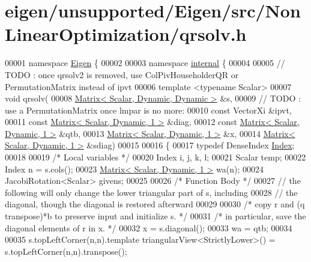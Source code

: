 \hypertarget{eigen_2unsupported_2_eigen_2src_2_non_linear_optimization_2qrsolv_8h_source}{}\section{eigen/unsupported/\+Eigen/src/\+Non\+Linear\+Optimization/qrsolv.h}
\label{eigen_2unsupported_2_eigen_2src_2_non_linear_optimization_2qrsolv_8h_source}

\begin{DoxyCode}
00001 \textcolor{keyword}{namespace }\hyperlink{namespace_eigen}{Eigen} \{ 
00002 
00003 \textcolor{keyword}{namespace }\hyperlink{namespaceinternal}{internal} \{
00004 
00005 \textcolor{comment}{// TODO : once qrsolv2 is removed, use ColPivHouseholderQR or PermutationMatrix instead of ipvt}
00006 \textcolor{keyword}{template} <\textcolor{keyword}{typename} Scalar>
00007 \textcolor{keywordtype}{void} qrsolv(
00008         \hyperlink{group___core___module}{Matrix< Scalar, Dynamic, Dynamic >} &s,
00009         \textcolor{comment}{// TODO : use a PermutationMatrix once lmpar is no more:}
00010         \textcolor{keyword}{const} VectorXi &ipvt,
00011         \textcolor{keyword}{const} \hyperlink{group___core___module}{Matrix< Scalar, Dynamic, 1 >}  &diag,
00012         \textcolor{keyword}{const} \hyperlink{group___core___module}{Matrix< Scalar, Dynamic, 1 >}  &qtb,
00013         \hyperlink{group___core___module}{Matrix< Scalar, Dynamic, 1 >}  &x,
00014         \hyperlink{group___core___module}{Matrix< Scalar, Dynamic, 1 >}  &sdiag)
00015 
00016 \{
00017     \textcolor{keyword}{typedef} DenseIndex \hyperlink{namespace_eigen_a62e77e0933482dafde8fe197d9a2cfde}{Index};
00018 
00019     \textcolor{comment}{/* Local variables */}
00020     Index i, j, k, l;
00021     Scalar temp;
00022     Index n = s.cols();
00023     \hyperlink{group___core___module}{Matrix< Scalar, Dynamic, 1 >}  wa(n);
00024     JacobiRotation<Scalar> givens;
00025 
00026     \textcolor{comment}{/* Function Body */}
00027     \textcolor{comment}{// the following will only change the lower triangular part of s, including}
00028     \textcolor{comment}{// the diagonal, though the diagonal is restored afterward}
00029 
00030     \textcolor{comment}{/*     copy r and (q transpose)*b to preserve input and initialize s. */}
00031     \textcolor{comment}{/*     in particular, save the diagonal elements of r in x. */}
00032     x = s.diagonal();
00033     wa = qtb;
00034 
00035     s.topLeftCorner(n,n).template triangularView<StrictlyLower>() = s.topLeftCorner(n,n).transpose();

\end{DoxyCode}
